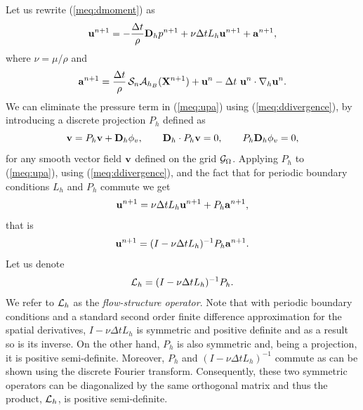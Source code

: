 Let us rewrite (\ref{meq:dmoment}) as
\begin{equation}
\mathbf{u}^{n+1}=-\frac{\Delta t}{\rho} \mathbf{D}_h p^{n+1} + \nu\Delta t L_h \mathbf{u}^{n+1} + \mathbf{a}^{n+1},
\label{meq:upa}
\end{equation}
where $\nu=\mu/\rho$ and
\begin{equation}
\mathbf{a}^{n+1}= \frac{\Delta t}{\rho}\, \mathcal{S}_n\mathcal{A}_{h_B}(\mathbf{X}^{n+1})+\mathbf{u}^n-\Delta t \, \, \mathbf{u}^n \cdot \nabla_h \mathbf{u}^n. \label{meq:a}
\end{equation}
We can eliminate the pressure term in (\ref{meq:upa}) using (\ref{meq:ddivergence}), by introducing a discrete projection
$P_h$ defined as 
\begin{equation}
\mathbf{v} = P_h \mathbf{v} + \mathbf{D}_h \phi_v, \qquad \mathbf{D}_h \cdot P_h \mathbf{v} =0, \qquad P_h \mathbf{D}_h \phi_v=0,
\end{equation}
for any smooth vector field $\mathbf{v}$ defined on the grid $\mathcal{G}_{\Omega}$. Applying $P_h$ to (\ref{meq:upa}), using  (\ref{meq:ddivergence}),  and the fact that for periodic boundary conditions $L_h$ and $P_h$ commute we get
\begin{equation}
\mathbf{u}^{n+1}= \nu\Delta t L_h \mathbf{u}^{n+1} + P_h \mathbf{a}^{n+1},
\end{equation}
that is
\begin{equation}
\mathbf{u}^{n+1} = (I -\nu\Delta t L_h)^{-1}  P_h \mathbf{a}^{n+1}.
\end{equation}
Let us denote
\begin{equation}
\mathcal{L}_h = (I -\nu\Delta t L_h)^{-1}  P_h. \label{meq:L_h}
\end{equation}
We refer to $\mathcal{L}_h$ as the
\textit{flow-structure operator}.
Note that with periodic boundary conditions and a standard second order finite difference approximation for the spatial derivatives,
  $I -\nu\Delta t L_h$ is symmetric and positive definite and as a result so is its inverse. 
  On the other hand, $P_h$ is also symmetric and, being 
  a projection, it is positive semi-definite. Moreover, $P_h$ and $(I -\nu\Delta t L_h)^{-1}$ commute 
  as can be shown using the discrete Fourier transform. Consequently, these two symmetric operators can be diagonalized by the same orthogonal matrix and thus the product, $\mathcal{L}_h $, is positive semi-definite. 

